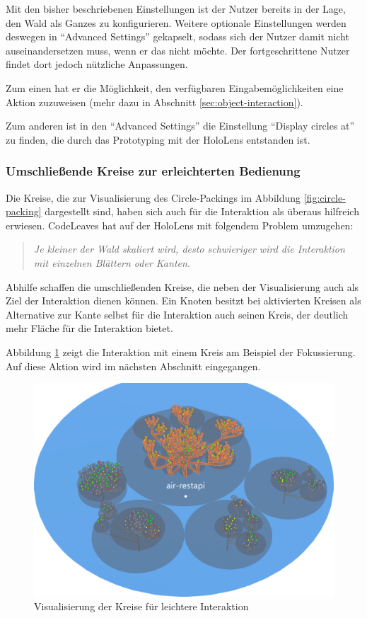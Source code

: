 Mit den bisher beschriebenen Einstellungen ist der Nutzer bereits in der Lage, den Wald als Ganzes zu konfigurieren. Weitere optionale Einstellungen werden deswegen in "`Advanced Settings"' gekapselt, sodass sich der Nutzer damit nicht auseinandersetzen muss, wenn er das nicht möchte. Der fortgeschrittene Nutzer findet dort jedoch nützliche Anpassungen.

Zum einen hat er die Möglichkeit, den verfügbaren Eingabemöglichkeiten eine Aktion zuzuweisen (mehr dazu in Abschnitt \ref{sec:object-interaction}).

Zum anderen ist in den "`Advanced Settings"' die Einstellung "`Display circles at"' zu finden, die durch das Prototyping mit der HoloLens entstanden ist.

\subsubsection*{Umschließende Kreise zur erleichterten Bedienung}
Die Kreise, die zur Visualisierung des Circle-Packings im Abbildung \ref{fig:circle-packing} dargestellt sind, haben sich auch für die Interaktion als überaus hilfreich erwiesen. CodeLeaves hat auf der HoloLens mit folgendem Problem umzugehen:

\begin{quote}
  \textit{Je kleiner der Wald skaliert wird, desto schwieriger wird die Interaktion mit einzelnen Blättern oder Kanten.}
\end{quote}

Abhilfe schaffen die umschließenden Kreise, die neben der Visualisierung auch als Ziel der Interaktion dienen können. Ein Knoten besitzt bei aktivierten Kreisen als Alternative zur Kante selbst für die Interaktion auch seinen Kreis, der deutlich mehr Fläche für die Interaktion bietet.

Abbildung \ref{fig:circle-hover} zeigt die Interaktion mit einem Kreis am Beispiel der Fokussierung. Auf diese Aktion wird im nächsten Abschnitt eingegangen.

\begin{figure}[htb]
  \includegraphics[width=.8\textwidth]{figures/circle-hover}
  \caption{Visualisierung der Kreise für leichtere Interaktion}
  \label{fig:circle-hover}
\end{figure}


